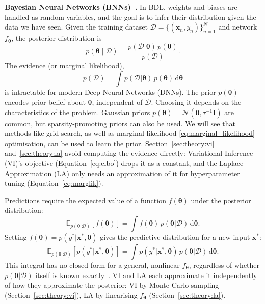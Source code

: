 \documentclass[conference]{IEEEtran}
\newcommand{\btheta}{\bm{\theta}}
\newcommand{\cD}{\mathcal{D}}
\newcommand{\cN}{\mathcal{N}}
\begin{document}
\textbf{Bayesian Neural Networks (BNNs)~\citep{goan2020bayesian,murphy2023pml}.} In BDL,
weights and biases are handled as random variables, and the goal is to
infer their distribution given the data we have seen. Given the training dataset $\cD =
\{(\bm{x}_n, y_n)\} _{n=1}^{N}$ and network $f_{\btheta}$, the posterior distribution is
\begin{equation}p(\btheta \mid \cD) = \frac{p(\cD|\btheta)\,p(\btheta)}{p(\cD)}.
\end{equation} The evidence (or marginal likelihood), \begin{equation}p(\cD) = \int
p(\cD|\btheta)\,p(\btheta)\,\mathrm{d}\btheta\label{eq:marginal_likelihood}\end{equation} is
intractable for modern Deep Neural Networks (DNNs). The prior $p(\btheta)$ encodes prior
belief about $\btheta$, independent of $\cD$. Choosing it depends on the characteristics of
the problem. Gaussian priors $p(\btheta)=\cN(\bm{0},\tau^{-1}\mathbf{I})$ are common, but
sparsity-promoting priors can also be used. We will see that methods like grid search, as
well as marginal likelihood \eqref{eq:marginal_likelihood} optimisation, can be used to
learn the prior. Section~\ref{sec:theory:vi} and~\ref{sec:theory:la} avoid computing the
evidence directly: Variational Inference (VI)'s objective (Equation~\eqref{eq:elbo}) drops
it as a constant, and the Laplace Approximation (LA) only needs an approximation of it for
hyperparameter tuning (Equation~\eqref{eq:marglik}).

Predictions require the expected value of a function $f(\btheta)$ under the posterior
distribution:
\begin{equation}
    \mathbb{E}_{p(\btheta|\cD)}[f(\btheta)]
    = \int f(\btheta)\,p(\btheta|\cD)\,\mathrm{d}\btheta.
\end{equation}
Setting $f(\btheta) = p(y^*|\bm{x}^*, \btheta)$ gives the predictive distribution for a new
input $\bm{x}^*$:
\begin{equation}
    \mathbb{E}_{p(\btheta|\cD)}[p(y^*|\bm{x}^*, \btheta)]
    = \int p(y^*|\bm{x}^*, \btheta)\,p(\btheta|\cD)\,\mathrm{d}\btheta.
\end{equation}
This integral has no closed form for a general, nonlinear $f_{\btheta}$, regardless of
whether $p(\btheta|\cD)$ itself is known exactly~\citep{daxberger2021laplace}. VI and LA
each approximate it independently of how they approximate the posterior: VI by Monte Carlo
sampling (Section~\ref{sec:theory:vi}), LA by linearising $f_{\btheta}$
(Section~\ref{sec:theory:la}).
\end{document}
